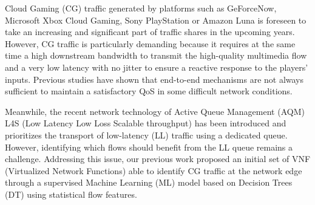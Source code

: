 Cloud Gaming (CG) traffic generated by platforms such as GeForceNow, Microsoft Xbox Cloud Gaming, Sony PlayStation or Amazon Luna is foreseen to take an increasing and significant part of traffic shares in the upcoming years. However, CG traffic is particularly demanding because it requires at the same time a high downstream bandwidth to transmit the high-quality multimedia flow and a very low latency with no jitter to ensure a reactive response to the players' inputs. Previous studies \cite{marchal2023analysis} have shown that end-to-end mechanisms are not always sufficient to maintain a satisfactory QoS in some difficult network conditions. 

Meanwhile, the recent network technology of Active Queue Management (AQM) L4S (Low Latency Low Loss Scalable throughput) has been introduced and prioritizes the transport of low-latency (LL) traffic using a dedicated queue. However, identifying which flows should benefit from the LL queue remains a challenge. Addressing this issue, our previous work \cite{NOMS} proposed an initial set of VNF (Virtualized Network Functions) able to identify CG traffic at the network edge through a supervised Machine Learning (ML) model based on Decision Trees (DT) using statistical flow features. 



 
